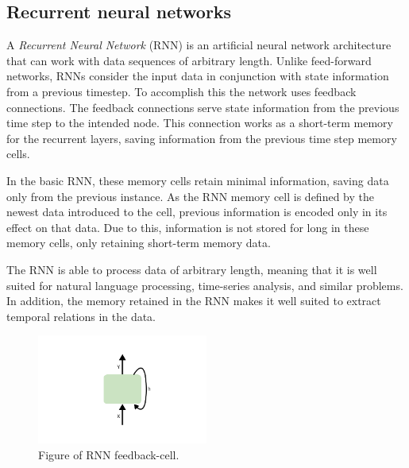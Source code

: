 \subsection{Recurrent neural networks}
\label{section:BT:RNN}

A \textit{Recurrent Neural Network} (RNN) is an artificial neural network architecture that can work with data sequences of arbitrary length.
Unlike feed-forward networks, RNNs consider the input data in conjunction with state information from a previous timestep.
To accomplish this the network uses feedback connections.
The feedback connections serve state information from the previous time step to the intended node.
This connection works as a short-term memory for the recurrent layers, saving information from the previous time step memory cells.

In the basic RNN, these memory cells retain minimal information, saving data only from the previous instance.
As the RNN memory cell is defined by the newest data introduced to the cell, previous information is encoded only in its effect on that data.
Due to this, information is not stored for long in these memory cells, only retaining short-term memory data.



The RNN is able to process data of arbitrary length, meaning that it is well suited for natural language processing, time-series analysis, and similar problems.
In addition, the memory retained in the RNN makes it well suited to extract temporal relations in the data.

\begin{figure}[h!]
  \centering
  \includegraphics[width=0.5\textwidth]{./sections/BT/figures/RNN.png}
  \hfill
  \caption{Figure of RNN feedback-cell.}
  \label{fig:rnn-cell}
\end{figure}



